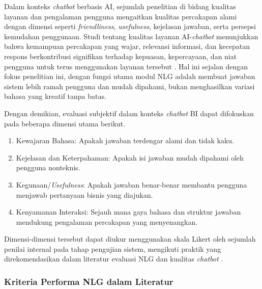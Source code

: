 Dalam konteks \textit{chatbot} berbasis AI, sejumlah penelitian di bidang kualitas layanan dan pengalaman pengguna mengaitkan kualitas percakapan alami dengan dimensi seperti \textit{friendliness}, \textit{usefulness}, kejelasan jawaban, serta persepsi kemudahan penggunaan. Studi tentang kualitas layanan AI-\textit{chatbot} menunjukkan bahwa kemampuan percakapan yang wajar, relevansi informasi, dan kecepatan respons berkontribusi signifikan terhadap kepuasan, kepercayaan, dan niat pengguna untuk terus menggunakan layanan tersebut \autocite{Syarifudin2024AIChatbotQuality,hsu2023chatbotsatisfaction}. Hal ini sejalan dengan fokus penelitian ini, dengan fungsi utama modul NLG adalah membuat jawaban sistem lebih ramah pengguna dan mudah dipahami, bukan menghasilkan variasi bahasa yang kreatif tanpa batas.

Dengan demikian, evaluasi subjektif dalam konteks \textit{chatbot} BI dapat difokuskan pada beberapa dimensi utama berikut.
\begin{enumerate}[label=\alph*.]
    \item Kewajaran Bahasa: Apakah jawaban terdengar alami dan tidak kaku.
    \item Kejelasan dan Keterpahaman: Apakah isi jawaban mudah dipahami oleh pengguna nonteknis.
    \item Kegunaan/\textit{Usefulness}: Apakah jawaban benar-benar membantu pengguna menjawab pertanyaan bisnis yang diajukan.
    \item Kenyamanan Interaksi: Sejauh mana gaya bahasa dan struktur jawaban mendukung pengalaman percakapan yang menyenangkan.
\end{enumerate}

Dimensi-dimensi tersebut dapat diukur menggunakan skala Likert oleh sejumlah penilai internal pada tahap pengujian sistem, mengikuti praktik yang direkomendasikan dalam literatur evaluasi NLG dan kualitas \textit{chatbot} \autocite{vanDerLee2021HumanEval,Syarifudin2024AIChatbotQuality}.

\subsubsection{Kriteria Performa NLG dalam Literatur}

